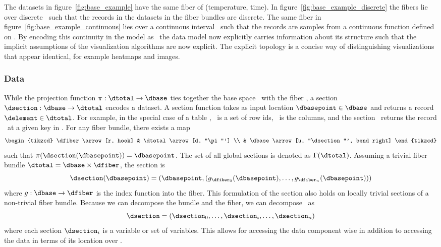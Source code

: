 \documentclass[../main.tex]{subfiles}
\begin{document}
The datasets in figure~\ref{fig:base_example} have the same fiber of (temperature, time). In figure~\ref{fig:base_example_discrete} the fibers lie over discrete \dbase\ such that the records in the datasets in the fiber bundles are discrete. The same fiber in figure~\ref{fig:base_example_continuous} lies over a continuous interval \dbase\ such that the records are samples from a continuous function defined on \dbase. By encoding this continuity in the model as \dbase\, the data model now explicitly carries information about its structure such that the implicit assumptions of the visualization algorithms are now explicit. The explicit topology is a concise way of distinguishing visualizations that appear identical, for example heatmaps and images.  
 
\subsubsection{Data \dsection}
\label{sec:data_section}
While the projection function $\pi:\dtotal \rightarrow\dbase$ ties together the base space \dbase\ with the fiber \dfiber, a section $\dsection: \dbase\rightarrow \dtotal$ encodes a dataset. A section function takes as input location $\dbasepoint \in \dbase$ and returns a record $\delement \in \dtotal$. For example, in the special case of a table \cite{spivakSIMPLICIALDATABASES}, \dbase\ is a set of row ids, \dfiber\ is the columns, and the section \dsection\ returns the record \delement\ at a given key in \dbase. For any fiber bundle, there exists a map
\begin{equation}
    \begin{tikzcd}
        \dfiber \arrow[r, hook] & \dtotal \arrow[d, "\pi"'] \\
                          & \dbase \arrow[u, "\dsection"', bend right]
    \end{tikzcd}
\end{equation}
 such that $\pi(\dsection(\dbasepoint)) = \dbasepoint$. The set of all global sections is denoted as $\Gamma(\dtotal)$. Assuming a trivial fiber bundle $\dtotal = \dbase \times \dfiber$, the section is 
\begin{equation}
    \label{eq:section_return}
    \dsection(\dbasepoint) = (\dbasepoint, (g_{\dfiber_{0}}(\dbasepoint), \ldots, g_{\dfiber_{n}}(\dbasepoint)))
\end{equation}
where $g: \dbase \rightarrow \dfiber$ is the index function into the fiber. This formulation of the section also holds on locally trivial sections of a non-trivial fiber bundle. Because we can decompose the bundle and the fiber, we can decompose \dsection\ as 
\begin{equation}
\label{eq:data_section_decompose}
\dsection= (\dsection_0,\ldots, \dsection_i, \dots, \dsection_n) 
\end{equation}
where each section $\dsection_i$ is a variable or set of variables. This allows for accessing the data component wise in addition to accessing the data in terms of its location over \dbase.
\end{document}
